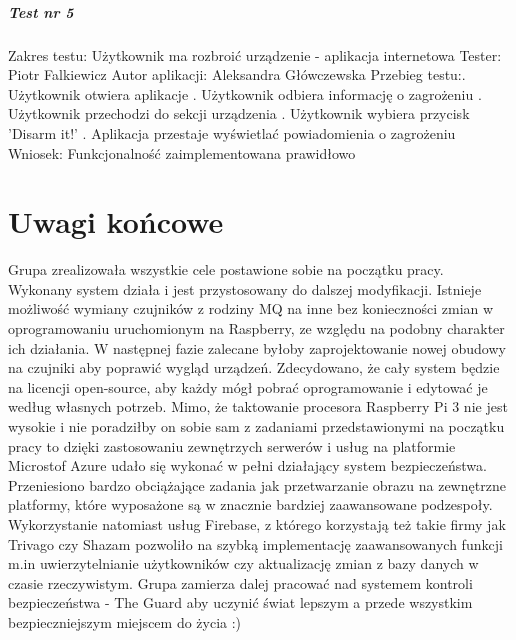  \paragraph{Test nr 5}
Zakres testu:\newline
Użytkownik ma rozbroić urządzenie - aplikacja internetowa\newline
Tester: Piotr Falkiewicz \newline
Autor aplikacji: Aleksandra Główczewska \newline
Przebieg testu:. Użytkownik otwiera aplikacje . Użytkownik odbiera informację o zagrożeniu . Użytkownik przechodzi do sekcji urządzenia . Użytkownik wybiera przycisk 'Disarm it!' . Aplikacja przestaje wyświetlać powiadomienia o zagrożeniu \newline
Wniosek:\newline
Funkcjonalność zaimplementowana prawidłowo\newline
\newline

\chapter{Uwagi końcowe}

Grupa zrealizowała wszystkie cele postawione sobie na początku pracy. Wykonany system działa i jest przystosowany do dalszej modyfikacji. Istnieje możliwość wymiany czujników z rodziny MQ na inne bez konieczności zmian w oprogramowaniu uruchomionym na Raspberry, ze względu na podobny charakter ich działania. W następnej fazie zalecane byłoby zaprojektowanie nowej obudowy na czujniki aby poprawić wygląd urządzeń. Zdecydowano, że cały system będzie na licencji open-source, aby każdy mógł pobrać oprogramowanie i edytować je według własnych potrzeb. Mimo, że taktowanie procesora Raspberry Pi 3 nie jest wysokie i nie poradziłby on sobie sam z zadaniami przedstawionymi na początku pracy to dzięki zastosowaniu zewnętrzych serwerów i usług na platformie Microstof Azure udało się wykonać w pełni działający system bezpieczeństwa. Przeniesiono bardzo obciążające zadania jak przetwarzanie obrazu na zewnętrzne platformy, które wyposażone są w znacznie bardziej zaawansowane podzespoły. Wykorzystanie natomiast usług Firebase, z którego korzystają też takie firmy jak Trivago czy Shazam pozwoliło na szybką implementację zaawansowanych funkcji m.in uwierzytelnianie użytkowników czy aktualizację zmian z bazy danych w czasie rzeczywistym. 
Grupa zamierza dalej pracować nad systemem kontroli bezpieczeństwa - The Guard aby uczynić świat lepszym a przede wszystkim bezpieczniejszym miejscem do życia :)
